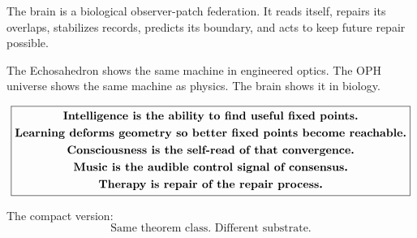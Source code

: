 \documentclass[11pt]{article}
\theoremstyle{remark}
\theoremstyle{plain}
\begin{document}
The brain is a biological observer-patch federation. It reads itself, repairs its overlaps, stabilizes records, predicts its boundary, and acts to keep future repair possible.

The Echosahedron shows the same machine in engineered optics. The OPH universe shows the same machine as physics. The brain shows it in biology.

\[
\boxed{
\begin{gathered}
\text{\bfseries Intelligence is the ability to find useful fixed points.}\\
\text{\bfseries Learning deforms geometry so better fixed points become reachable.}\\
\text{\bfseries Consciousness is the self-read of that convergence.}\\
\text{\bfseries Music is the audible control signal of consensus.}\\
\text{\bfseries Therapy is repair of the repair process.}
\end{gathered}
}
\]

The compact version:
\[
\boxed{
\text{Same theorem class. Different substrate.}
}
\]
\end{document}
